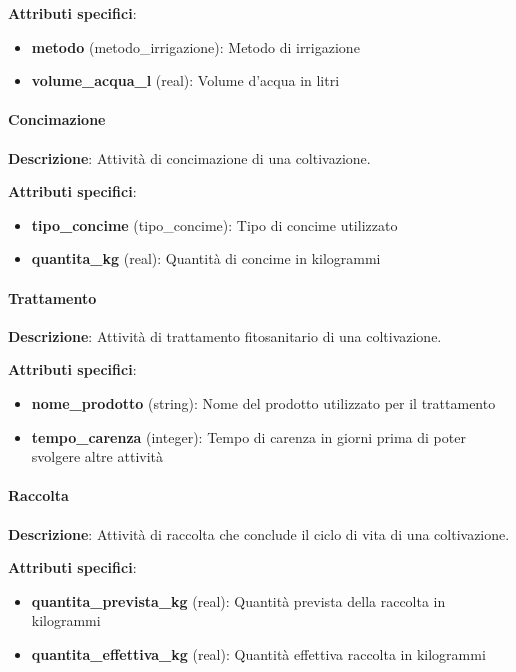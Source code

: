 \documentclass[12pt,a4paper]{article}
\begin{document}
\textbf{Attributi specifici}:
\begin{itemize}[leftmargin=2.5cm]
    \item \textbf{metodo} (metodo\_irrigazione): Metodo di irrigazione
    \item \textbf{volume\_acqua\_l} (real): Volume d'acqua in litri
\end{itemize}

\paragraph{Concimazione}
\textbf{Descrizione}: Attività di concimazione di una coltivazione.

\textbf{Attributi specifici}:
\begin{itemize}[leftmargin=2.5cm]
    \item \textbf{tipo\_concime} (tipo\_concime): Tipo di concime utilizzato
    \item \textbf{quantita\_kg} (real): Quantità di concime in kilogrammi
\end{itemize}

\paragraph{Trattamento}
\textbf{Descrizione}: Attività di trattamento fitosanitario di una coltivazione.

\textbf{Attributi specifici}:
\begin{itemize}[leftmargin=2.5cm]
    \item \textbf{nome\_prodotto} (string): Nome del prodotto utilizzato per il trattamento
    \item \textbf{tempo\_carenza} (integer): Tempo di carenza in giorni prima di poter svolgere altre attività
\end{itemize}

\paragraph{Raccolta}
\textbf{Descrizione}: Attività di raccolta che conclude il ciclo di vita di una coltivazione.

\textbf{Attributi specifici}:
\begin{itemize}[leftmargin=2.5cm]
    \item \textbf{quantita\_prevista\_kg} (real): Quantità prevista della raccolta in kilogrammi
    \item \textbf{quantita\_effettiva\_kg} (real): Quantità effettiva raccolta in kilogrammi
\end{itemize}
\end{document}
